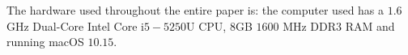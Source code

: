 The hardware used throughout the entire paper is: the computer used has a $1.6$ GHz Dual-Core Intel Core i$5-5250$U CPU, $8$GB $1600$ MHz DDR3 RAM  and running macOS $10.15$. 











